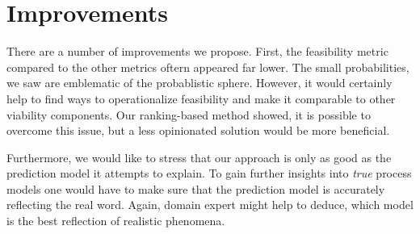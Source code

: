 \documentclass[12pt,a4paper]{report}
\begin{document}

\section{Improvements}
There are a number of improvements we propose. First, the feasibility metric compared to the other metrics oftern appeared far lower. The small probabilities, we saw are emblematic of the probablistic sphere. However, it would certainly help to find ways to operationalize feasibility and make it comparable to other viability components. Our ranking-based method showed, it is possible to overcome this issue, but a less opinionated solution would be more beneficial. 

Furthermore, we would like to stress that our approach is only as good as the prediction model it attempts to explain. To gain further insights into \emph{true} process models one would have to make sure that the prediction model is accurately reflecting the real word. Again, domain expert might help to deduce, which model is the best reflection of realistic phenomena.
\end{document}

